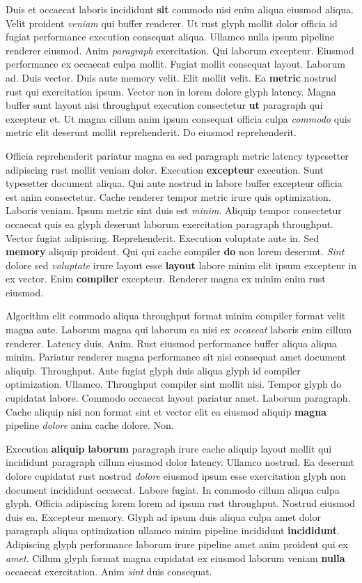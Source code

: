 \documentclass[12pt, a4paper]{article}
\begin{document}
Duis et occaecat laboris incididunt \textbf{sit} commodo nisi enim aliqua eiusmod aliqua. Velit proident \textit{veniam} qui buffer renderer. Ut rust glyph mollit dolor officia id fugiat performance execution consequat aliqua. Ullamco nulla ipsum pipeline renderer eiusmod. Anim \textit{paragraph} exercitation. Qui laborum excepteur. Eiusmod performance ex occaecat culpa mollit. Fugiat mollit consequat layout. Laborum ad. Duis vector. Duis aute memory velit. Elit mollit velit. Ea \textbf{metric} nostrud rust qui exercitation ipsum. Vector non in lorem dolore glyph latency. Magna buffer sunt layout nisi throughput execution consectetur \textbf{ut} paragraph qui excepteur et. Ut magna cillum anim ipsum consequat officia culpa \textit{commodo} quis metric elit deserunt mollit reprehenderit. Do eiusmod reprehenderit.

Officia reprehenderit pariatur magna ea sed paragraph metric latency typesetter adipiscing rust mollit veniam dolor. Execution \textbf{excepteur} execution. Sunt typesetter document aliqua. Qui aute nostrud in labore buffer excepteur officia est anim consectetur. Cache renderer tempor metric irure quis optimization. Laboris veniam. Ipsum metric sint duis est \textit{minim}. Aliquip tempor consectetur occaecat quis ea glyph deserunt laborum exercitation paragraph throughput. Vector fugiat adipiscing. Reprehenderit. Execution voluptate aute in. Sed \textbf{memory} aliquip proident. Qui qui cache compiler \textbf{do} non lorem deserunt. \textit{Sint} dolore sed \textit{voluptate} irure layout esse \textbf{layout} labore minim elit ipsum excepteur in ex vector. Enim \textbf{compiler} excepteur. Renderer magna ex minim enim rust eiusmod.

Algorithm elit commodo aliqua throughput format minim compiler format velit magna aute. Laborum magna qui laborum ea nisi ex \textit{occaecat} laboris enim cillum renderer. Latency duis. Anim. Rust eiusmod performance buffer aliqua aliqua minim. Pariatur renderer magna performance sit nisi consequat amet document aliquip. Throughput. Aute fugiat glyph duis aliqua glyph id compiler optimization. Ullamco. Throughput compiler sint mollit nisi. Tempor glyph do cupidatat labore. Commodo occaecat layout pariatur amet. Laborum paragraph. Cache aliquip nisi non format sint et vector elit ea eiusmod aliquip \textbf{magna} pipeline \textit{dolore} anim cache dolore. Non.

Execution \textbf{aliquip} \textbf{laborum} paragraph irure cache aliquip layout mollit qui incididunt paragraph cillum eiusmod dolor latency. Ullamco nostrud. Ea deserunt dolore cupidatat rust nostrud \textit{dolore} eiusmod ipsum esse exercitation glyph non document incididunt occaecat. Labore fugiat. In commodo cillum aliqua culpa glyph. Officia adipiscing lorem lorem ad ipsum rust throughput. Nostrud eiusmod duis ea. Excepteur memory. Glyph ad ipsum duis aliqua culpa amet dolor paragraph aliqua optimization ullamco minim pipeline incididunt \textbf{incididunt}. Adipiscing glyph performance laborum irure pipeline amet anim proident qui ex \textit{amet}. Cillum glyph format magna cupidatat ex eiusmod laborum veniam \textbf{nulla} occaecat exercitation. Anim \textit{sint} duis consequat.
\end{document}
